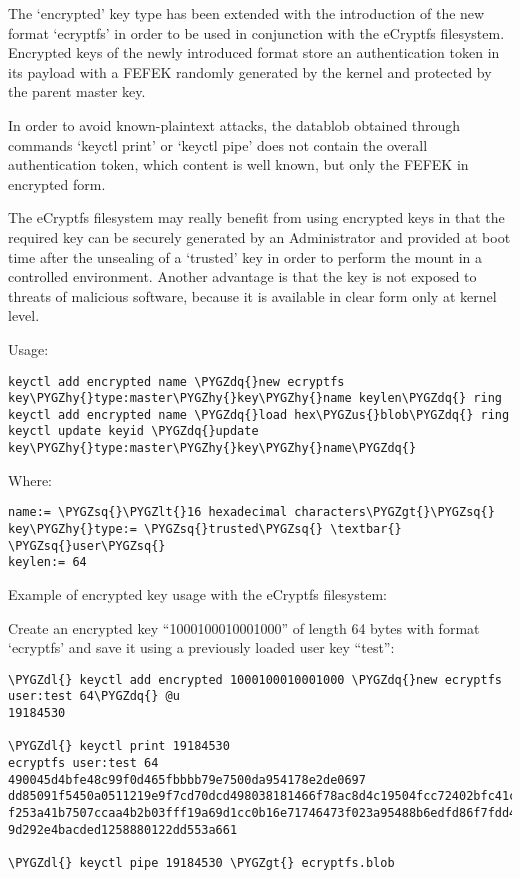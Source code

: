 \documentclass[a4paper,8pt,english]{sphinxmanual}
\def\PYGZus{\char`\_}
\def\PYGZlt{\char`\<}
\def\PYGZgt{\char`\>}
\def\PYGZdl{\char`\$}
\def\PYGZhy{\char`\-}
\def\PYGZsq{\char`\'}
\def\PYGZdq{\char`\"}
\renewcommand\PYGZsq{\textquotesingle}
\begin{document}
The `encrypted' key type has been extended with the introduction of the new
format `ecryptfs' in order to be used in conjunction with the eCryptfs
filesystem.  Encrypted keys of the newly introduced format store an
authentication token in its payload with a FEFEK randomly generated by the
kernel and protected by the parent master key.

In order to avoid known-plaintext attacks, the datablob obtained through
commands `keyctl print' or `keyctl pipe' does not contain the overall
authentication token, which content is well known, but only the FEFEK in
encrypted form.

The eCryptfs filesystem may really benefit from using encrypted keys in that the
required key can be securely generated by an Administrator and provided at boot
time after the unsealing of a `trusted' key in order to perform the mount in a
controlled environment.  Another advantage is that the key is not exposed to
threats of malicious software, because it is available in clear form only at
kernel level.

Usage:

\begin{Verbatim}[commandchars=\\\{\}]
keyctl add encrypted name \PYGZdq{}new ecryptfs key\PYGZhy{}type:master\PYGZhy{}key\PYGZhy{}name keylen\PYGZdq{} ring
keyctl add encrypted name \PYGZdq{}load hex\PYGZus{}blob\PYGZdq{} ring
keyctl update keyid \PYGZdq{}update key\PYGZhy{}type:master\PYGZhy{}key\PYGZhy{}name\PYGZdq{}
\end{Verbatim}

Where:

\begin{Verbatim}[commandchars=\\\{\}]
name:= \PYGZsq{}\PYGZlt{}16 hexadecimal characters\PYGZgt{}\PYGZsq{}
key\PYGZhy{}type:= \PYGZsq{}trusted\PYGZsq{} \textbar{} \PYGZsq{}user\PYGZsq{}
keylen:= 64
\end{Verbatim}

Example of encrypted key usage with the eCryptfs filesystem:

Create an encrypted key ``1000100010001000'' of length 64 bytes with format
`ecryptfs' and save it using a previously loaded user key ``test'':

\begin{Verbatim}[commandchars=\\\{\}]
\PYGZdl{} keyctl add encrypted 1000100010001000 \PYGZdq{}new ecryptfs user:test 64\PYGZdq{} @u
19184530

\PYGZdl{} keyctl print 19184530
ecryptfs user:test 64 490045d4bfe48c99f0d465fbbbb79e7500da954178e2de0697
dd85091f5450a0511219e9f7cd70dcd498038181466f78ac8d4c19504fcc72402bfc41c2
f253a41b7507ccaa4b2b03fff19a69d1cc0b16e71746473f023a95488b6edfd86f7fdd40
9d292e4bacded1258880122dd553a661

\PYGZdl{} keyctl pipe 19184530 \PYGZgt{} ecryptfs.blob
\end{Verbatim}
\end{document}

